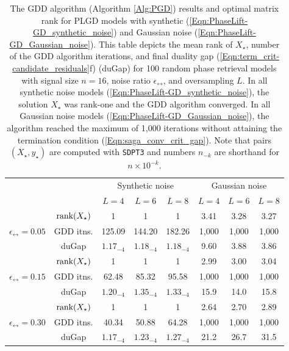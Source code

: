 \begin{table}[H]
\centering 
\begin{tabular}{ |cc|c|c|c|c|c|c| }
\hline
	\multicolumn{2}{|c|}{} &	\multicolumn{3}{c|}{Synthetic noise} 	&	\multicolumn{3}{c|}{Gaussian noise}  \\
\multicolumn{2}{|c|}{}  	&	\multicolumn{1}{c}{$L = 4$}	&	\multicolumn{1}{c}{$L = 6$}	&	\multicolumn{1}{c|}{$L = 8$} &	\multicolumn{1}{c}{$L = 4$}	&	\multicolumn{1}{c}{$L = 6$}	&	\multicolumn{1}{c|}{$L = 8$}		\\
\hline
& $\textnormal{rank}(X_\star)$
	&	1	&	1	&	1	&	3.41 	&	3.28 	&	3.27 \\
$\epsilon_\rel = 0.05$ &	 GDD itns.
	&	125.09	&	144.20 & 182.26	&	1,000	&	1,000	&	1,000\\
& 	duGap
	&	$1.17_{-4}$  &  $1.18_{-4}$ &  $1.18_{-4}$ 	&	9.60   & 3.88   & 3.86\\
\hline
& $\textnormal{rank}(X_\star)$
	&	1	&	1	&	1	&	2.99 	&	3.00 &	3.04 \\
$\epsilon_\rel = 0.15$ &	 GDD itns.
	&	62.48  & 85.32 &  95.58	&	1,000	&	1,000	&	1,000\\
& 	duGap
	&	$1.20_{-4}$ &  $1.35_{-4}$ &  $1.33_{-4}$ &	15.9 &  14.0 &  15.8 \\
\hline
& $\textnormal{rank}(X_\star)$
	&	1	&	1	&	1	&	2.64  	&	2.70  &	2.89\\
$\epsilon_\rel = 0.30$ &	 GDD itns.
	&	40.34  & 50.88  & 64.28	&	1,000	&	1,000	&	1,000\\
& 	duGap
	&	$1.17_{-4}$ &  $1.23_{-4}$ &  $1.27_{-4}$		&	   21.2 &  26.7  & 31.5\\
 \hline
\end{tabular}
\vspace{0.5cm}
\caption{The GDD algorithm (Algorithm \ref{Alg:PGD}) results and optimal matrix rank for PLGD models with synthetic (\ref{Eqn:PhaseLift-GD_synthetic_noise}) and Gaussian noise (\ref{Eqn:PhaseLift-GD_Gaussian_noise}).  This table depicts the mean rank of $X_\star$, number of the GDD algorithm iterations, and final duality gap (\ref{Eqn:term_crit-candidate_residuals}f) (duGap) for 100 random phase retrieval models with signal size $n=16$, noise ratio $\epsilon_\rel$, and oversampling $L$.  In all synthetic noise models (\ref{Eqn:PhaseLift-GD_synthetic_noise}), the solution $X_\star$ was rank-one and the GDD algorithm converged.  In all Gaussian noise models (\ref{Eqn:PhaseLift-GD_Gaussian_noise}), the algorithm reached the maximum of 1,000 iterations without attaining the termination condition (\ref{Eqn:saga_conv_crit_gap}).  Note that pairs $(X_\star, y_\star)$ are computed with \texttt{SDPT3} and numbers $n_{-k}$ are shorthand for $n \times 10^{-k}$.} \label{Tab:average_rank_soln_matrix_with_gaussian_dual_variable}
\end{table}


